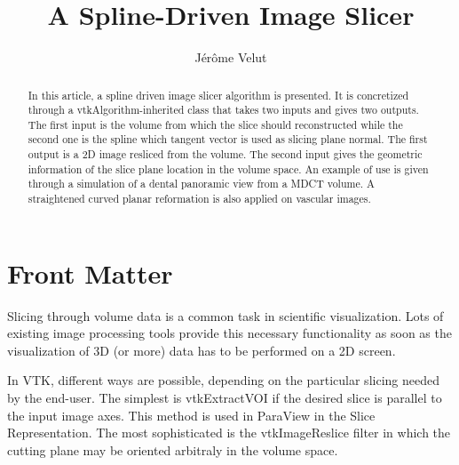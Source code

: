 \documentclass{InsightArticle}
\title{A Spline-Driven Image Slicer}
\author{J\'er\^ome Velut}
\newcommand{\IJhandlerIDnumber}{xxxx}
\begin{document}
%
% 
\IJhandlefooter{\IJhandlerIDnumber}


\ifpdf
\else
\fi


\maketitle


\ifhtml
\chapter*{Front Matter\label{front}}
\fi


\begin{abstract}
\noindent
In this article, a spline driven image slicer algorithm is presented. It is
concretized through a vtkAlgorithm-inherited class that takes two inputs and
gives two outputs. The first input is the volume from which the slice should
reconstructed while the second one is the spline which tangent vector is used as
slicing plane normal. The first output is a 2D image resliced from the volume.
The second input gives the geometric information of the slice plane location in
the volume space. An example of use is given through a simulation of a dental
panoramic view from a MDCT volume. A straightened curved planar reformation is
also applied on vascular images.
\end{abstract}

\IJhandlenote{\IJhandlerIDnumber}

\tableofcontents
%
Slicing through volume data is a common task in scientific visualization. Lots
of existing image processing tools provide this necessary functionality as soon
as the visualization of 3D (or more) data has to be performed on a 2D screen.

In VTK, different ways are possible, depending on the particular slicing needed
by the end-user. The simplest is vtkExtractVOI if the desired slice is parallel
to the input image axes. This method is used in ParaView in the Slice 
Representation. The most sophisticated is the vtkImageReslice filter in which
the cutting plane may be oriented arbitraly in the volume space. 
\end{document}
